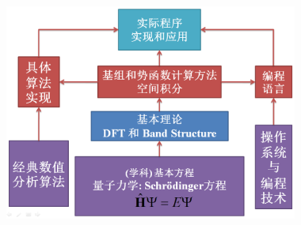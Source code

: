 \frame
{
\begin{figure}[h!]
\vspace*{-0.25in}
\centering
\includegraphics[height=2.80in,width=4.95in,viewport=5 3 1250 780,clip]{Figures/Method_Procedure.png}
\label{Method-Procedure}
\end{figure}
}

